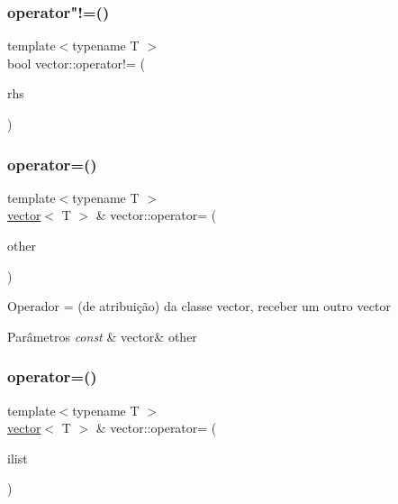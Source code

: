 \subsubsection{\texorpdfstring{operator"!=()}{operator!=()}}
{\footnotesize\ttfamily template$<$typename T $>$ \\
bool vector\+::operator!= (\begin{DoxyParamCaption}\item[{const \mbox{\hyperlink{classsc_1_1vector}{vector}}$<$ T $>$ \&}]{rhs }\end{DoxyParamCaption})}

\mbox{\label{classsc_1_1vector_acb19d7e567b317cb9e9f20b68b923ff9}} 
\subsubsection{\texorpdfstring{operator=()}{operator=()}\hspace{0.1cm}{\footnotesize\ttfamily [1/2]}}
{\footnotesize\ttfamily template$<$typename T $>$ \\
\mbox{\hyperlink{classsc_1_1vector}{vector}}$<$ T $>$ \& vector\+::operator= (\begin{DoxyParamCaption}\item[{const \mbox{\hyperlink{classsc_1_1vector}{vector}}$<$ T $>$ \&}]{other }\end{DoxyParamCaption})}

Operador = (de atribuição) da classe vector, receber um outro vector 
\begin{DoxyParams}{Parâmetros}
{\em const} & vector\& other \\
\hline
\end{DoxyParams}
\mbox{\label{classsc_1_1vector_ac06042d1df3ec08ca421c33205a0a62b}} 
\subsubsection{\texorpdfstring{operator=()}{operator=()}\hspace{0.1cm}{\footnotesize\ttfamily [2/2]}}
{\footnotesize\ttfamily template$<$typename T $>$ \\
\mbox{\hyperlink{classsc_1_1vector}{vector}}$<$ T $>$ \& vector\+::operator= (\begin{DoxyParamCaption}\item[{std\+::initializer\+\_\+list$<$ T $>$}]{ilist }\end{DoxyParamCaption})}


